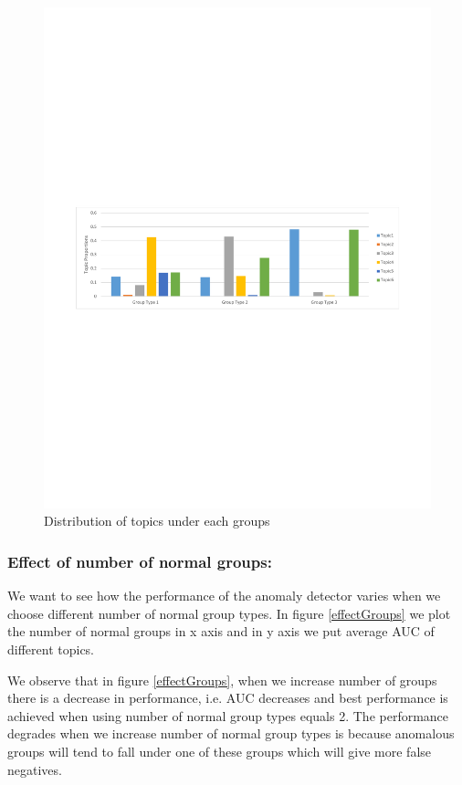 \documentclass[letterpaper]{article}
\begin{document}
\begin{figure}[t]
\begin{center}
\includegraphics[bb = 55 320 560 470,clip=true,width=1\textwidth]{T3_K6_Chi.pdf}
\end{center}
\caption{Distribution of topics under each groups}\label{distTopic}
\end{figure}


\subsubsection{Effect of number of normal groups:} We want to see how the performance of the anomaly detector varies when we choose different number of normal group types. In figure \ref{effectGroups} we plot the number of normal groups in x axis and in y axis we put average AUC of different topics.

We observe that in figure \ref{effectGroups}, when we increase number of groups there is a decrease in performance, i.e. AUC decreases and best performance is achieved when using number of normal group types equals 2. The performance degrades when we increase number of normal group types is because anomalous groups will tend to fall under one of these groups which will give more false negatives.
\end{document}
